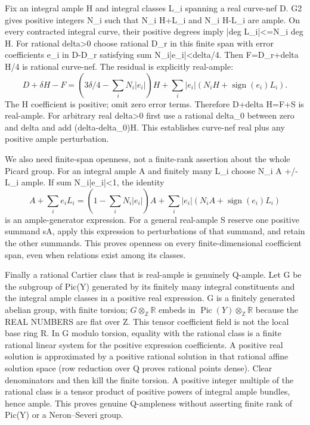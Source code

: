 \documentclass[11pt]{article}
\begin{document}
Fix an integral ample H and integral classes L\_i spanning a real curve-nef D. G2 gives positive integers N\_i such that N\_i H+L\_i and N\_i H-L\_i are ample. On every contracted integral curve, their positive degrees imply |deg L\_i|<=N\_i deg H. For rational delta>0 choose rational D\_r in this finite span with error coefficients e\_i in D-D\_r satisfying sum N\_i|e\_i|<delta/4. Then F=D\_r+delta H/4 is rational curve-nef. The residual is explicitly real-ample:
\[
D+\delta H-F=(3\delta/4-\sum_i N_i|e_i|)H+
\sum_i |e_i|(N_iH+\operatorname{sign}(e_i)L_i).
\]
The H coefficient is positive; omit zero error terms. Therefore D+delta H=F+S is real-ample. For arbitrary real delta>0 first use a rational delta\_0 between zero and delta and add (delta-delta\_0)H. This establishes curve-nef real plus any positive ample perturbation.

We also need finite-span openness, not a finite-rank assertion about the whole Picard group. For an integral ample A and finitely many L\_i choose N\_i A +/- L\_i ample. If sum N\_i|e\_i|<1, the identity
\[
A+\sum_i e_iL_i=(1-\sum_i N_i|e_i|)A+
\sum_i|e_i|(N_iA+\operatorname{sign}(e_i)L_i)
\]
is an ample-generator expression. For a general real-ample S reserve one positive summand sA, apply this expression to perturbations of that summand, and retain the other summands. This proves openness on every finite-dimensional coefficient span, even when relations exist among its classes.

Finally a rational Cartier class that is real-ample is genuinely Q-ample. Let G be the subgroup of Pic(Y) generated by its finitely many integral constituents and the integral ample classes in a positive real expression. G is a finitely generated abelian group, with finite torsion; \(G\otimes_{\mathbb Z}\mathbb R\) embeds in \(\operatorname{Pic}(Y)\otimes_{\mathbb Z}\mathbb R\) because the REAL NUMBERS are flat over Z. This tensor coefficient field is not the local base ring R. In G modulo torsion, equality with the rational class is a finite rational linear system for the positive expression coefficients. A positive real solution is approximated by a positive rational solution in that rational affine solution space (row reduction over Q proves rational points dense). Clear denominators and then kill the finite torsion. A positive integer multiple of the rational class is a tensor product of positive powers of integral ample bundles, hence ample. This proves genuine Q-ampleness without asserting finite rank of Pic(Y) or a Neron--Severi group.
\end{document}

